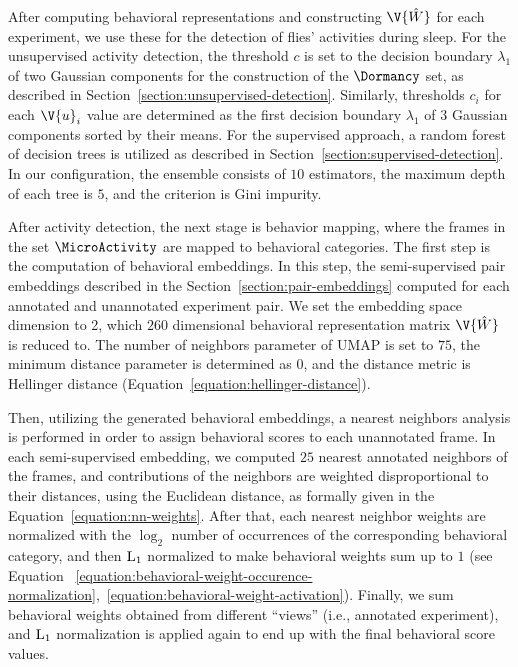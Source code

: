 After computing behavioral representations and constructing $\V{\hat{W}}$ for each experiment, we use these for the detection of flies' activities during sleep.
For the unsupervised activity detection, the threshold $c$ is set to the decision boundary $\lambda_1$ of two Gaussian components for the construction of the $\Dormancy$ set, as described in Section~\ref{section:unsupervised-detection}.
Similarly, thresholds $c_i$ for each $\V{u}_i$ value are determined as the first decision boundary $\lambda_1$ of $3$ Gaussian components sorted by their means.
For the supervised approach, a random forest of decision trees \citep{breiman_random_2001} is utilized as described in Section~\ref{section:supervised-detection}.
In our configuration, the ensemble consists of $10$ estimators, the maximum depth of each tree is $5$, and the criterion is Gini impurity.

After activity detection, the next stage is behavior mapping, where the frames in the set $\MicroActivity$ are mapped to behavioral categories.
The first step is the computation of behavioral embeddings.
In this step, the semi-supervised pair embeddings described in the Section~\ref{section:pair-embeddings} computed for each annotated and unannotated experiment pair.
We set the embedding space dimension to 2, which $260$ dimensional behavioral representation matrix $\V{\hat{W}}$ is reduced to.
The number of neighbors parameter of UMAP is set to $75$, the minimum distance parameter is determined as $0$, and the distance metric is Hellinger distance (Equation~\ref{equation:hellinger-distance}).

Then, utilizing the generated behavioral embeddings, a nearest neighbors analysis is performed in order to assign behavioral scores to each unannotated frame.
In each semi-supervised embedding, we computed $25$ nearest annotated neighbors of the frames, and contributions of the neighbors are weighted disproportional to their distances, using the Euclidean distance, as formally given in the Equation~\ref{equation:nn-weights}.
After that, each nearest neighbor weights are normalized with the $\log_2$ number of occurrences of the corresponding behavioral category, and then $\textnormal{L}_1$ normalized to make behavioral weights sum up to $1$ (see Equation ~\ref{equation:behavioral-weight-occurence-normalization},~\ref{equation:behavioral-weight-activation}).
Finally, we sum behavioral weights obtained from different ``views'' (i.e., annotated experiment), and $\textnormal{L}_1$ normalization is applied again to end up with the final behavioral score values.

